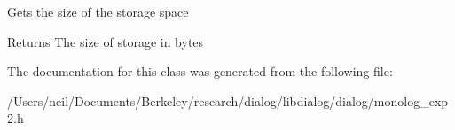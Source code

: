 Gets the size of the storage space \begin{DoxyReturn}{Returns}
The size of storage in bytes 
\end{DoxyReturn}


The documentation for this class was generated from the following file\+:\begin{DoxyCompactItemize}
\item 
/\+Users/neil/\+Documents/\+Berkeley/research/dialog/libdialog/dialog/monolog\+\_\+exp2.\+h\end{DoxyCompactItemize}
